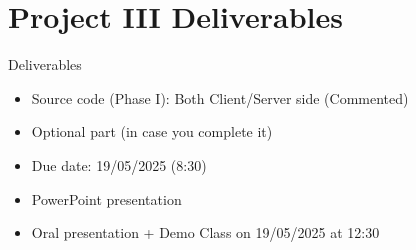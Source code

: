 \section{Project III Deliverables}
\begin{frame}{Deliverables}
    \begin{itemize}
        \item Source code (Phase I): Both Client/Server side (Commented)
        \item Optional part (in case you complete it)
        \item Due date: 19/05/2025 (8:30)
        \item PowerPoint presentation 
        \item Oral presentation + Demo Class on 19/05/2025 at 12:30
    \end{itemize}
\end{frame}
